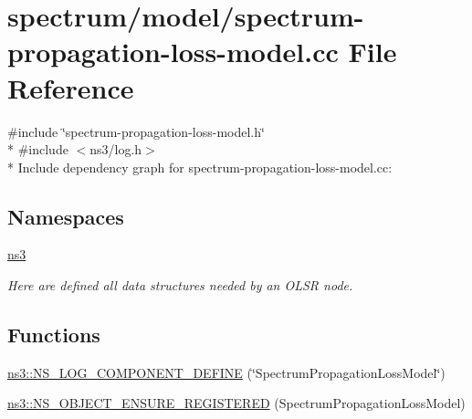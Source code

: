 \hypertarget{spectrum-propagation-loss-model_8cc}{}\section{spectrum/model/spectrum-\/propagation-\/loss-\/model.cc File Reference}
\label{spectrum-propagation-loss-model_8cc}
{\ttfamily \#include \char`\"{}spectrum-\/propagation-\/loss-\/model.\+h\char`\"{}}\\*
{\ttfamily \#include $<$ns3/log.\+h$>$}\\*
Include dependency graph for spectrum-\/propagation-\/loss-\/model.cc\+:
\subsection*{Namespaces}
\begin{DoxyCompactItemize}
\item 
 \hyperlink{namespacens3}{ns3}
\begin{DoxyCompactList}\small\item\em Here are defined all data structures needed by an O\+L\+SR node. \end{DoxyCompactList}\end{DoxyCompactItemize}
\subsection*{Functions}
\begin{DoxyCompactItemize}
\item 
\hyperlink{namespacens3_a43295d33efb545e4915497f57e9c809e}{ns3\+::\+N\+S\+\_\+\+L\+O\+G\+\_\+\+C\+O\+M\+P\+O\+N\+E\+N\+T\+\_\+\+D\+E\+F\+I\+NE} (\char`\"{}Spectrum\+Propagation\+Loss\+Model\char`\"{})
\item 
\hyperlink{namespacens3_a3f83961db38231730954c4b457141744}{ns3\+::\+N\+S\+\_\+\+O\+B\+J\+E\+C\+T\+\_\+\+E\+N\+S\+U\+R\+E\+\_\+\+R\+E\+G\+I\+S\+T\+E\+R\+ED} (Spectrum\+Propagation\+Loss\+Model)
\end{DoxyCompactItemize}
